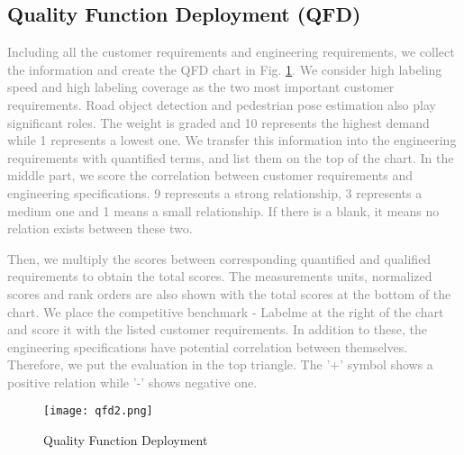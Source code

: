 \subsection{Quality Function Deployment (QFD)}
\textcolor{gray}{Including all the customer requirements and engineering requirements, we collect the information and create the QFD chart in Fig. \ref{fig:qfd}. We consider high labeling speed and high labeling coverage as the two most important customer requirements. Road object detection and pedestrian pose estimation also play significant roles. The weight is graded and 10 represents the highest demand while 1 represents a lowest one. We transfer this information into the engineering requirements with quantified terms, and list them on the top of the chart. In the middle part, we score the correlation between customer requirements and engineering specifications. 9 represents a strong relationship, 3 represents a medium one and 1 means a small relationship. If there is a blank, it means no relation exists between these two.}

\textcolor{gray}{Then, we multiply the scores between corresponding quantified and qualified requirements to obtain the total scores. The measurements units, normalized scores and rank orders are also shown with the total scores at the bottom of the chart. We place the competitive benchmark - Labelme at the right of the chart and score it with the listed customer requirements. In addition to these, the engineering specifications have potential correlation between themselves. Therefore, we put the evaluation in the top triangle. The '+' symbol shows a positive relation while '-' shows negative one. }
\begin{figure}[htbp]
  \centering \texttt{[image: qfd2.png]} %
  \caption{Quality Function Deployment}
  \label{fig:qfd}
\end{figure}